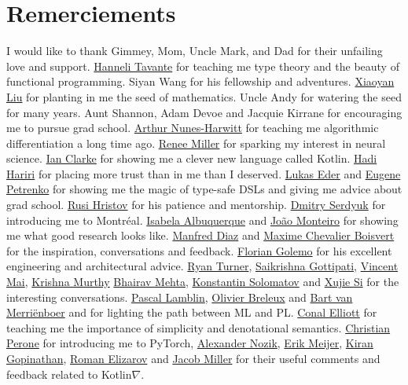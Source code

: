 \documentclass[12pt,initial,twoside,maitrise]{dms}
\numberwithin{equation}{section}
\numberwithin{table}{chapter}
\numberwithin{figure}{chapter}
\begin{document}
\chapter*{Remerciements}
\vspace{-60pt} I would like to thank Gimmey, Mom, Uncle Mark, and Dad for their unfailing love and support. \href{http://hannelita.com/}{Hanneli Tavante} for teaching me type theory and the beauty of functional programming. Siyan Wang for his fellowship and adventures. \href{https://laverne.edu/directory/person/xiaoyan-liu/}{Xiaoyan Liu} for planting in me the seed of mathematics. Uncle Andy for watering the seed for many years. Aunt Shannon, Adam Devoe and Jacquie Kirrane for encouraging me to pursue grad school. \href{https://www.cs.rit.edu/~anh/}{Arthur Nunes-Harwitt} for teaching me algorithmic differentiation a long time ago. \href{http://www.sas.rochester.edu/bcs/people/faculty/miller_renee/index.html}{Renee Miller} for sparking my interest in neural science. \href{http://blog.locut.us}{Ian Clarke} for showing me a clever new language called Kotlin. \href{https://hadihariri.com/}{Hadi Hariri} for placing more trust than in me than I deserved. \href{http://www.jooq.org/}{Lukas Eder} and \href{https://jonnyzzz.com/}{Eugene Petrenko} for showing me the magic of type-safe DSLs and giving me advice about grad school. \href{https://github.com/rusi}{Rusi Hristov} for his patience and mentorship. \href{https://scholar.google.ca/citations?user=PsKlNzUAAAAJ}{Dmitry Serdyuk} for introducing me to Montr\'eal. \href{https://scholar.google.ca/citations?user=-Ss9QGkAAAAJ}{Isabela Albuquerque} and \href{https://scholar.google.ca/citations?user=hkO47vsAAAAJ}{Jo\~ao Monteiro} for showing me what good research looks like. \href{https://takeitallsource.github.io}{Manfred Diaz} and \href{https://pointersgonewild.com/}{Maxime Chevalier Boisvert} for the inspiration, conversations and feedback. \href{https://fgolemo.github.io/}{Florian Golemo} for his excellent engineering and architectural advice. \href{http://TurnerComputing.com}{Ryan Turner}, \href{https://saikrishna-1996.github.io}{Saikrishna Gottipati}, \href{http://maivincent.github.io}{Vincent Mai}, \href{https://krrish94.github.io/}{Krishna Murthy} \href{https://bhairavmehta95.github.io/}{Bhairav Mehta}, \href{http://www.solomatov.me/}{Konstantin Solomatov} and \href{https://www.seas.upenn.edu/~xsi/}{Xujie Si} for the interesting conversations. \href{https://scholar.google.ca/citations?user=bn4xHHIAAAAJ}{Pascal Lamblin}, \href{http://breuleux.net}{Olivier Breleux} and \href{https://scholar.google.ca/citations?user=XE9SDzgAAAAJ}{Bart van Merri\"enboer} and for lighting the path between ML and PL. \href{http://conal.net/}{Conal Elliott} for teaching me the importance of simplicity and denotational semantics. \href{http://christianperone.com}{Christian Perone} for introducing me to PyTorch, \href{https://research.jetbrains.org/researchers/altavir}{Alexander Nozik}, \href{https://twitter.com/headinthebox}{Erik Meijer}, \href{https://scholar.google.com/citations?user=IcuGXgcAAAAJ}{Kiran Gopinathan}, \href{https://medium.com/@elizarov}{Roman Elizarov} and \href{https://cquic.unm.edu/member/jacob.miller/}{Jacob Miller} for their useful comments and feedback related to Kotlin$\nabla$. 
\end{document}
